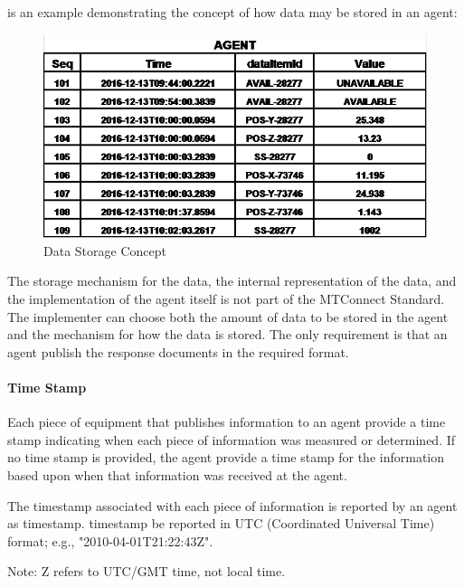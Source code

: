 \documentclass{mtconnect}	%
\begin{document}
 is an example demonstrating the concept of how data may be stored in an \gls{agent}:

\begin{figure}[ht]
  \centering
  \includegraphics[width=1.0\textwidth]{figures/data-storage-concept.png}
  \caption{Data Storage Concept}
  \label{fig:data-storage-concept}
\end{figure}

\FloatBarrier


The storage mechanism for the data, the internal representation of the data, and the implementation of the \gls{agent} itself is not part of the MTConnect Standard.  The implementer can choose both the amount of data to be stored in the \gls{agent} and the mechanism for how the data is stored.  The only requirement is that an \gls{agent} publish the \glspl{response document} in the required format.  

\paragraph{Time Stamp}\mbox{}
\label{sec:Time Stamp}

Each piece of equipment that publishes information to an \gls{agent} \SHOULD provide a time stamp indicating when each piece of information was measured or determined.  If no time stamp is provided, the \gls{agent} \MUST provide a time stamp for the information based upon when that information was received at the \gls{agent}.

The \gls{timestamp} associated with each piece of information is reported by an \gls{agent} as \gls{timestamp}.  \gls{timestamp} \MUST be reported in UTC (Coordinated Universal Time) format; e.g., "2010-04-01T21:22:43Z".

\begin{note}
Note:  Z refers to UTC/GMT time, not local time.

\end{note}
\end{document}

